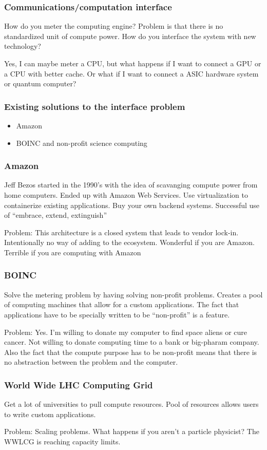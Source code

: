 \documentclass{beamer}
\begin{document}
\begin{frame}
  \frametitle{Communications/computation interface}
  How do you meter the computing engine?  Problem is that there is no
  standardized unit of compute power.  How do you interface the system
  with new technology?

  Yes, I can maybe meter a CPU, but what happens if I want to connect
  a GPU or a CPU with better cache.  Or what if I want to connect a
  ASIC hardware system or quantum computer?
\end{frame}

\begin{frame}
  \frametitle{Existing solutions to the interface problem}
  \begin{itemize}
  \item Amazon
  \item BOINC and non-profit science computing
  \end{itemize}
\end{frame}

\begin{frame}
  \frametitle{Amazon}

 Jeff Bezos started in the 1990's with the idea of scavanging compute
 power from home computers.  Ended up with Amazon Web Services.  Use
 virtualization to containerize existing applications.  Buy your own
 backend systems.  Successful use of ``embrace, extend, extinguish''

 Problem: This architecture is a closed system that leads to vendor
 lock-in.  Intentionally no way of adding to the ecosystem.  Wonderful
 if you are Amazon.  Terrible if you are computing with Amazon
\end{frame}

\begin{frame}
  \frametitle{BOINC}

  Solve the metering problem by having solving non-profit problems.
  Creates a pool of computing machines that allow for a custom
  applications.  The fact that applications have to be specially
  written to be ``non-profit'' is a feature.

  Problem: Yes.  I'm willing to donate my computer to find space
  aliens or cure cancer.  Not willing to donate computing time to a
  bank or big-pharam company.  Also the fact that the compute purpose
  has to be non-profit means that there is no abstraction between the
  problem and the computer.
\end{frame}

\begin{frame}
  \frametitle{World Wide LHC Computing Grid}
  Get a lot of universities to pull compute resources.  Pool of
  resources allows users to write custom applications.

  Problem: Scaling problems.  What happens if you aren't a particle
  physicist?  The WWLCG is reaching capacity limits.
\end{frame}
\end{document}
